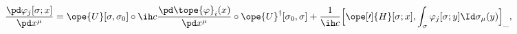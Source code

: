 \begin{equation}	\label{12.40}
\frac{\pd\varphi_j[\sigma;x]}{\pd x^\mu}
=
\ope{U}[\sigma,\sigma_0]
\circ \ih c\frac{\pd\tope{\varphi}_i(x)}{\pd x^\mu} \circ
\ope{U}^\dag[\sigma_0,\sigma]
+ \frac{1}{\ih c} \Bigl[\ope[\prime]{H}[\sigma;x] ,
	\int_\sigma \varphi_j[\sigma;y] \Id\sigma_\mu(y) \Bigr]_{\_} ,
	\end{equation}


